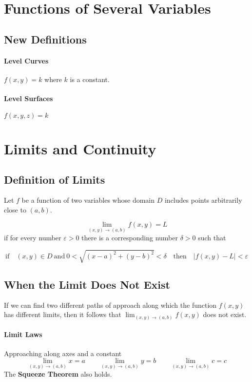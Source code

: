\documentclass{report}  %
\begin{document}
\setcounter{chapter}{14}
\section{Functions of Several Variables}
\subsection*{New Definitions}
\paragraph{Level Curves} 
 $f(x,y)=k$ where $k$ is a constant.
 
\paragraph{Level Surfaces}
$f(x,y,z)=k$

\section{Limits and Continuity}
\subsection*{Definition of Limits} 
Let $f$ be a function of two variables whose domain $D$ includes points arbitrarily close to $(a, b)$. 

\begin{equation}
	\lim_{(x,y) \to (a,b)} f(x, y) = L
\end{equation}
if for every number $\varepsilon > 0$ there is a corresponding number $\delta > 0$ such that 

\begin{equation}
	\text{if} \quad (x,y) \in D  \ \text{and} \ 0 < \sqrt{(x-a)^2 + (y-b)^2} < \delta \quad 
	\text{then} \quad |f(x,y) - L| < \varepsilon
\end{equation}

 
\subsection*{When the Limit Does Not Exist} 
If we can find two different paths of approach along which the function $f(x, y)$ has different limits, then it follows that $\lim_{(x, y) \to (a, b)} f(x, y)$ does not exist. 

\paragraph{Limit Laws} Approaching along axes and a constant
\begin{equation}
	\lim_{(x,y) \to (a,b)} x = a \qquad
	\lim_{(x,y) \to (a,b)} y = b \qquad
	\lim_{(x,y) \to (a,b)} c = c
\end{equation}
The \textbf{Squeeze Theorem} also holds.
\end{document}
